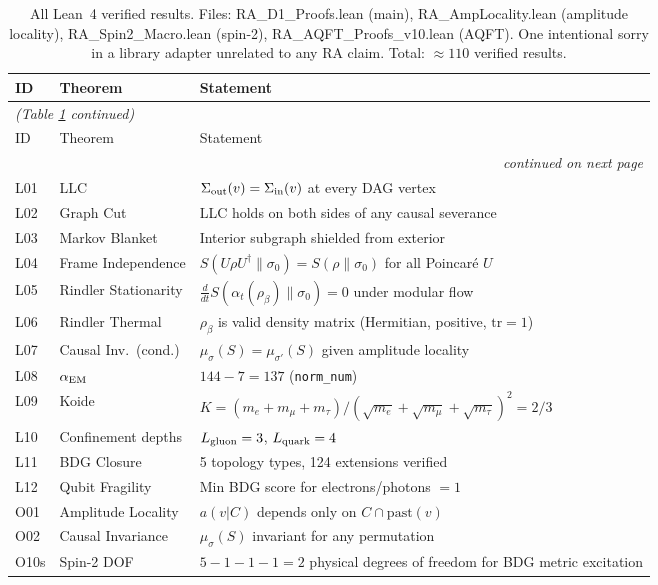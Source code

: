 \documentclass[12pt,a4paper]{article}
\begin{document}
\begin{longtable}{llp{9cm}}
\caption{All Lean~4 verified results.  Files: RA\_D1\_Proofs.lean (main), RA\_AmpLocality.lean (amplitude locality), RA\_Spin2\_Macro.lean (spin-2), RA\_AQFT\_Proofs\_v10.lean (AQFT).  One intentional sorry in a library adapter unrelated to any RA claim.  Total: $\approx110$ verified results.}\label{tab:lean}\\
\toprule
ID & Theorem & Statement\\
\midrule
\endfirsthead
\multicolumn{3}{l}{\textit{(Table \ref{tab:lean} continued)}}\\
\toprule
ID & Theorem & Statement\\
\midrule
\endhead
\midrule\multicolumn{3}{r}{\textit{continued on next page}}\\
\endfoot
\bottomrule
\endlastfoot
L01 & LLC & $\Sigma_{\rm out}(v)=\Sigma_{\rm in}(v)$ at every DAG vertex \\
L02 & Graph Cut & LLC holds on both sides of any causal severance \\
L03 & Markov Blanket & Interior subgraph shielded from exterior \\
L04 & Frame Independence & $S(U\rho U^\dagger\|\sigma_0)=S(\rho\|\sigma_0)$ for all Poincar\'e $U$ \\
L05 & Rindler Stationarity & $\frac{d}{dt}S(\alpha_t(\rho_\beta)\|\sigma_0)=0$ under modular flow \\
L06 & Rindler Thermal & $\rho_\beta$ is valid density matrix (Hermitian, positive, $\mathrm{tr}=1$) \\
L07 & Causal Inv.\ (cond.) & $\mu_\sigma(S)=\mu_{\sigma'}(S)$ given amplitude locality \\
L08 & $\alpha_{\rm EM}$ & $144-7=137$ (\texttt{norm\_num}) \\
L09 & Koide & $K=(m_e+m_\mu+m_\tau)/(\sqrt{m_e}+\sqrt{m_\mu}+\sqrt{m_\tau})^2=2/3$ \\
L10 & Confinement depths & $L_{\rm gluon}=3$, $L_{\rm quark}=4$ \\
L11 & BDG Closure & 5 topology types, 124 extensions verified \\
L12 & Qubit Fragility & Min BDG score for electrons/photons $=1$ \\
O01 & Amplitude Locality & $a(v|C)$ depends only on $C\cap\mathrm{past}(v)$ \\
O02 & Causal Invariance & $\mu_\sigma(S)$ invariant for any permutation \\
O10s & Spin-2 DOF & $5-1-1-1=2$ physical degrees of freedom for BDG metric excitation \\
\end{longtable}
\end{document}
